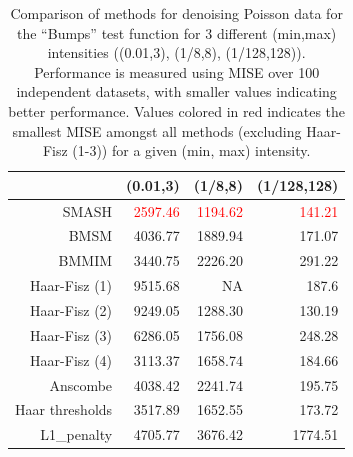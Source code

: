 \documentclass[12pt]{article}
\begin{document}
\begin{table}[ht]
\centering
\begin{tabular}{rrrr}
  \hline
 & (0.01,3) & (1/8,8) & (1/128,128) \\ 
  \hline
SMASH & \textcolor{red}{2597.46} & \textcolor{red}{1194.62} & \textcolor{red}{141.21} \\ 
  BMSM & 4036.77 & 1889.94 & 171.07 \\ 
  BMMIM & 3440.75 & 2226.20 & 291.22 \\ 
	Haar-Fisz (1) & 9515.68 & NA & 187.6 \\
	Haar-Fisz (2) & 9249.05 & 1288.30 & 130.19 \\
	Haar-Fisz (3) & 6286.05 & 1756.08 & 248.28 \\	
	Haar-Fisz (4) & 3113.37 & 1658.74 & 184.66 \\ 
  Anscombe & 4038.42 & 2241.74 & 195.75 \\ 
  Haar thresholds & 3517.89 & 1652.55 & 173.72 \\ 
  L1\_penalty & 4705.77 & 3676.42 & 1774.51 \\ 
   \hline
\end{tabular}
\caption{Comparison of methods for denoising Poisson data for the ``Bumps'' test function for 3 different (min,max) intensities ((0.01,3), (1/8,8), (1/128,128)). Performance is measured using MISE over 100 independent datasets, with smaller values indicating better performance. Values colored in red indicates the smallest MISE amongst all methods (excluding Haar-Fisz (1-3)) for a given (min, max) intensity.} 
\label{table:pois_b}
\end{table}
\end{document}
